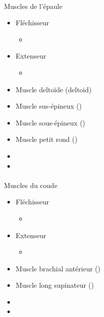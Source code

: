 \documentclass[pdftex,a4paper,11pt]{article}
\numberwithin{equation}{subsection}
\begin{document}
\paragraph{}
Muscles de l'épaule
\begin{itemize}
    \item Fléchisseur
    \begin{itemize}
        \item 
    \end{itemize}
    \item Extenseur
    \begin{itemize}
        \item 
    \end{itemize}

    \item Muscle deltoïde (deltoid)
    \item Muscle sus-épineux ()
    \item Muscle sous-épineux ()
    \item Muscle petit rond ()
    \item 
    \item 
\end{itemize}

\paragraph{}
Muscles du coude
\begin{itemize}
    \item Fléchisseur
    \begin{itemize}
        \item 
    \end{itemize}
    \item Extenseur
    \begin{itemize}
        \item 
    \end{itemize}

    \item Muscle brachial antérieur ()
    \item Muscle long supinateur ()
    \item 
    \item 
\end{itemize}
\end{document}
